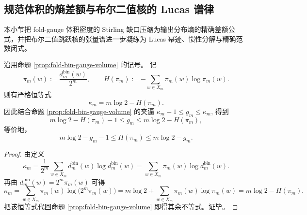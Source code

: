 \subsection{规范体积的熵差额与布尔二值核的 Lucas 谱律}\label{subsec:conclusion-fold-gauge-entropy-gap-boolean-lucas-kernel}
本小节把 fold-gauge 体积密度的 Stirling 缺口压缩为输出分布熵的精确差额公式，并把布尔二值跳跃核的张量谱进一步凝练为 Lucas 幂迹、惯性分解与精确范数闭式。

\begin{proposition}\label{prop:conclusion-fold-gauge-entropy-defect-exact}
沿用命题 \ref{prop:fold-bin-gauge-volume} 的记号。
记
\[
\pi_m(w):=\frac{d_m^{\mathrm{bin}}(w)}{2^m},
\qquad
H(\pi_m):=-\sum_{w\in X_m}\pi_m(w)\log \pi_m(w).
\]
则有严格恒等式
\[
\kappa_m=m\log 2-H(\pi_m).
\]
因此结合命题 \ref{prop:fold-bin-gauge-volume} 的夹逼
\(
\kappa_m-1\le g_m\le \kappa_m
\),
得到
\[
m\log 2-H(\pi_m)-1\le g_m\le m\log 2-H(\pi_m),
\]
等价地，
\[
m\log 2-g_m-1\le H(\pi_m)\le m\log 2-g_m.
\]
\end{proposition}
\begin{proof}
由定义
\[
\kappa_m
=
\frac{1}{2^m}\sum_{w\in X_m}d_m^{\mathrm{bin}}(w)\log d_m^{\mathrm{bin}}(w)
=
\sum_{w\in X_m}\pi_m(w)\log d_m^{\mathrm{bin}}(w).
\]
再由
\(
d_m^{\mathrm{bin}}(w)=2^m\pi_m(w)
\)
可得
\[
\kappa_m
=
\sum_{w\in X_m}\pi_m(w)\log\bigl(2^m\pi_m(w)\bigr)
=
m\log 2+\sum_{w\in X_m}\pi_m(w)\log \pi_m(w)
=
m\log 2-H(\pi_m).
\]
把该恒等式代回命题 \ref{prop:fold-bin-gauge-volume} 即得其余不等式。证毕。
\end{proof}

